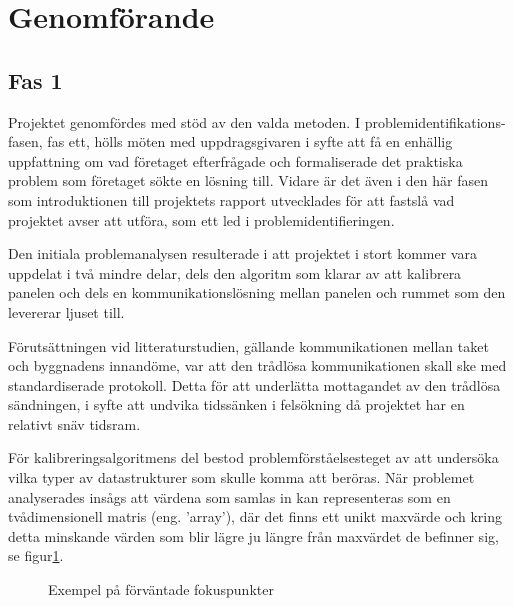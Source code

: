 \section{Genomförande} %
\label{sec:genomf_rande}
    \subsection{Fas 1} %
    \label{sub:steg_1}
        Projektet genomfördes med stöd av den valda metoden. I problemidentifikations-fasen, fas ett, hölls möten med uppdragsgivaren i syfte att få en enhällig uppfattning om vad företaget efterfrågade och formaliserade det praktiska problem som företaget sökte en lösning till. Vidare är det även i den här fasen som introduktionen till projektets rapport utvecklades för att fastslå vad projektet avser att utföra, som ett led i problemidentifieringen. \bigskip

        Den initiala problemanalysen resulterade i att projektet i stort kommer vara uppdelat i två mindre delar, dels den algoritm som klarar av att kalibrera panelen och dels en kommunikationslösning mellan panelen och rummet som den levererar ljuset till. \bigskip

        Förutsättningen vid litteraturstudien, gällande kommunikationen mellan taket och byggnadens innandöme, var att den trådlösa kommunikationen skall ske med standardiserade protokoll. Detta för att underlätta mottagandet av den trådlösa sändningen, i syfte att undvika tidssänken i felsökning då projektet har en relativt snäv tidsram.\bigskip

        För kalibreringsalgoritmens del bestod problemförståelsesteget av att undersöka vilka typer av datastrukturer som skulle komma att beröras. När problemet analyserades insågs att värdena som samlas in kan representeras som en tvådimensionell matris (eng. 'array'), där det finns ett unikt maxvärde och kring detta minskande värden som blir lägre ju längre från maxvärdet de befinner sig, se figur\ref{fig:array}. \bigskip

        \begin{figure}[hbt]
        \centering
            \begin{subfigure}{0.2\textwidth}
            \end{subfigure}
            \begin{subfigure}{0.2\textwidth}
            \end{subfigure}
        \caption{\label{fig:array} Exempel på förväntade fokuspunkter}
        \end{figure}


